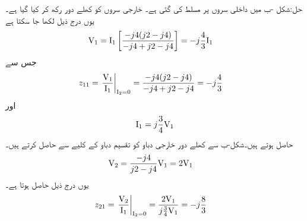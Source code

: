حل:شکل -ب میں داخلی سروں پر  مسلط کی گئی ہے۔ خارجی سروں کو کھلے دور رکھ کر  کیا گیا ہے۔یوں درج ذیل لکھا جا سکتا ہے
\begin{align*}
{\ensuremath{{\textup{V}}}}_1&={{\textup{I}}}_1\left[\frac{-j4(j2-j4)}{-j4+j2-j4}\right]=-j\frac{4}{3}{{\textup{I}}}_1
\end{align*}
جس سے
\begin{align*}
z_{11}&=\left. \frac{{{\textup{V}}}_1}{{{\textup{I}}}_1}\right|_{{{\textup{I}}}_2=0}=\frac{-j4(j2-j4)}{-j4+j2-j4}=-j\frac{4}{3}
\end{align*}
اور
\begin{align*}
{\ensuremath{{\textup{I}}}}_1=j\frac{3}{4}{{\textup{V}}}_1
\end{align*}
حاصل ہوتے ہیں۔شکل-ب سے کھلے دور خارجی دباو کو تقسیم دباو کے کلیے سے حاصل کرتے ہیں۔
\begin{align*}
{\ensuremath{{\textup{V}}}}_2&=\frac{-j4}{j2-j4}{{\textup{V}}}_1=2{{\textup{V}}}_1
\end{align*}
یوں درج ذیل حاصل ہوتا ہے۔
\begin{align*}
z_{21}&=\left. \frac{{{\textup{V}}}_2}{{{\textup{I}}}_1}\right|_{{{\textup{I}}}_2=0}=\frac{2{{\textup{V}}}_1}{j\frac{3}{4}{{\textup{V}}}_1}=-j\frac{8}{3}
\end{align*}

